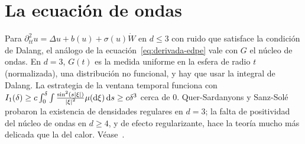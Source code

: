 \section{La ecuación de ondas}
Para $\partial^2_{tt}u=\Delta u+b(u)+\sigma(u)\dot W$ en $d\le3$ con ruido que satisface la condición de Dalang, el
análogo de la ecuación~\eqref{eq:derivada-edpe} vale con $G$ el núcleo de ondas. En $d=3$, $G(t)$ es la medida uniforme
en la esfera de radio $t$ (normalizada), una distribución no funcional, y hay que usar la integral de
Dalang. La estrategia de la ventana temporal funciona con $I_1(\delta)\ge c\int_0^\delta\int\frac{\sin^2(s\left\lvert \xi\right\rvert)}{\left\lvert \xi\right\rvert^2}\mu(\mathrm{d}\xi)\,\mathrm{d} s\ge c\delta^3$
cerca de 0. Quer-Sardanyons y Sanz-Solé probaron la existencia de densidades regulares en
$d=3$; la falta de positividad del núcleo de ondas en $d\ge4$, y de efecto regularizante, hace la
teoría mucho más delicada que la del calor. Véase~\cite{SanzSole05}.
